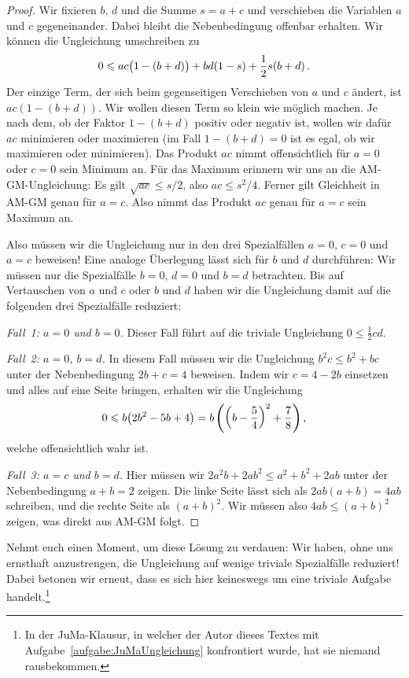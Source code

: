 \begin{proof}
	Wir fixieren $b$, $d$ und die Summe $s=a+c$ und verschieben die Variablen $a$ und $c$ gegeneinander. Dabei bleibt die Nebenbedingung offenbar erhalten. Wir können die Ungleichung umschreiben zu
	\begin{equation*}
		0\leqslant ac\parens[\big]{1-(b+d)}+bd(1-s)+\frac12s(b+d)\,.
	\end{equation*}
	Der einzige Term, der sich beim gegenseitigen Verschieben von $a$ und $c$ ändert, ist $ac(1-(b+d))$. Wir wollen diesen Term so klein wie möglich machen. Je nach dem, ob der Faktor $1-(b+d)$ positiv oder negativ ist, wollen wir dafür $ac$ minimieren oder maximieren (im Fall $1-(b+d)=0$ ist es egal, ob wir maximieren oder minimieren). Das Produkt $ac$ nimmt offensichtlich für $a=0$ oder $c=0$ sein Minimum an. Für das Maximum erinnern wir uns an die AM-GM-Ungleichung: Es gilt $\sqrt{ac}\leqslant s/2$, also $ac\leqslant s^2/4$. Ferner gilt Gleichheit in AM-GM genau für $a=c$. Also nimmt das Produkt $ac$ genau für $a=c$ sein Maximum an.
	
	Also müssen wir die Ungleichung nur in den drei Spezialfällen $a=0$, $c=0$ und $a=c$ beweisen! Eine analoge Überlegung lässt sich für $b$ und $d$ durchführen: Wir müssen nur die Spezialfälle $b=0$, $d=0$ und $b=d$ betrachten. Bis auf Vertauschen von $a$ und $c$ oder $b$ und $d$ haben wir die Ungleichung damit auf die folgenden drei Spezialfälle reduziert:
	
	\emph{Fall~1: $a=0$ und $b=0$.} Dieser Fall führt auf die triviale Ungleichung $0\leqslant \frac12 cd$.
	
	\emph{Fall~2: $a=0$, $b=d$.} In diesem Fall müssen wir die Ungleichung $b^2c\leqslant b^2+bc$ unter der Nebenbedingung $2b+c=4$ beweisen. Indem wir $c=4-2b$ einsetzen und alles auf eine Seite bringen, erhalten wir die Ungleichung
	\begin{equation*}
		0\leqslant b\parens*{2b^2-5b+4}=b\,\parens*{\parens*{b-\frac{5}{4}}^2+\frac78}\,,
	\end{equation*}
	welche offensichtlich wahr ist.
	
	\emph{Fall~3: $a=c$ und $b=d$.} Hier müssen wir $2a^2b+2ab^2\leqslant a^2+b^2+2ab$ unter der Nebenbedingung $a+b=2$ zeigen. Die linke Seite lässt sich als $2ab(a+b)=4ab$ schreiben, und die rechte Seite als $(a+b)^2$. Wir müssen also $4ab\leqslant (a+b)^2$ zeigen, was direkt aus AM-GM folgt.
\end{proof}

Nehmt euch einen Moment, um diese Lösung zu verdauen: Wir haben, ohne uns ernsthaft anzustrengen, die Ungleichung auf wenige triviale Spezialfälle reduziert! Dabei betonen wir erneut, dass es sich hier keineswegs um eine triviale Aufgabe handelt.\footnote{In der JuMa-Klausur, in welcher der Autor dieses Textes mit Aufgabe~\ref{aufgabe:JuMaUngleichung} konfrontiert wurde, hat sie niemand rausbekommen.}

